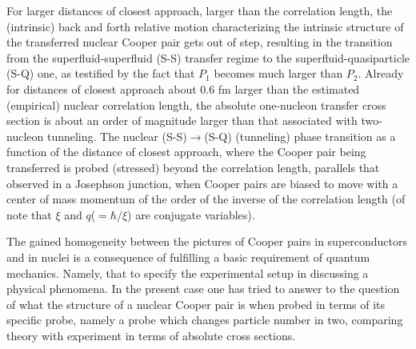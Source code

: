  For larger distances of closest approach, larger than the correlation length, the (intrinsic) back and forth relative motion  characterizing the intrinsic structure of the transferred nuclear Cooper pair gets out of step, resulting in the transition from the superfluid-superfluid (S-S) transfer regime to the superfluid-quasiparticle (S-Q) one, as testified by the fact that  $P_1$ becomes much larger than $P_2$. Already for distances of closest approach about 0.6 fm larger than the estimated (empirical) nuclear correlation length, the absolute  one-nucleon transfer cross section is about an order of magnitude larger than that associated with two-nucleon tunneling. The nuclear (S-S)$\to$(S-Q) (tunneling) phase transition as a function of the distance of closest approach, where the Cooper pair being transferred is probed (stressed) beyond the correlation length, parallels that observed in a Josephson junction, when  Cooper pairs are biased to move with a center of mass momentum of the order of the inverse of the correlation length  (of note that $\xi$ and $q$($=\hbar/\xi$) are conjugate variables).

 The gained homogeneity  between the pictures of Cooper pairs in superconductors and in nuclei is a consequence of fulfilling a basic requirement of quantum mechanics. Namely, that to specify the experimental setup in discussing a physical phenomena. In the present case one has tried to answer to the question of what the structure of a nuclear Cooper pair is when probed in terms of its specific probe, namely a probe which changes particle number in two,  comparing theory with experiment in terms of absolute cross sections. 












